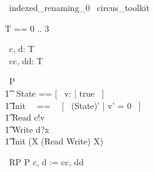 \begin{zsection}
  \SECTION\ indexed\_renaming\_0 \parents\ circus\_toolkit
\end{zsection}

\begin{zed}
	T == 0 .. 3 
\end{zed}

\begin{circus}
	\circchannel\ c, d: T \\
	\circchannel\ cc, dd: T \\
\end{circus}

\begin{circus}
    \circprocess\ P \circdef \circbegin \\
        \t1 \circstate\ State == [~ v: \nat | true ~] \\
        \t1 Init ~~==~~ [~ (State)' | v' = 0 ~] \\
        \t1 Read \circdef c!v \then \Skip \\
        \t1 Write \circdef d?x \then \Skip \\
        \t1 \circspot \lschexpract Init \rschexpract \circseq (\circmu X \circspot (Read \extchoice Write) \circseq X) \\ 
	\circend
\end{circus}

\begin{circus}
    \circprocess\ RP \circdef P \lcircrename c, d := cc, dd \rcircrename \\
\end{circus}

